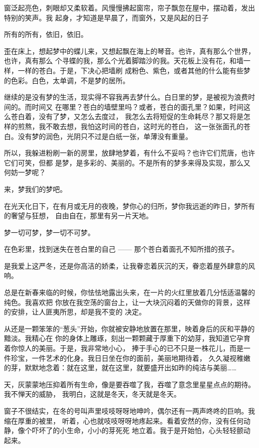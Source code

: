 		窗泛起亮色，刺眼却又柔软着。风慢慢拂起窗帘，帘子飘忽在屋中，摆动着，发出特别的笑声。我
	起身，才知道是早晨了，而窗外，又是风起的日子

		所有的所有，依旧，依旧。

		歪在床上，想起梦中的蝶儿来，又想起飘在海上的琴音。也许，真有那么个世界，也许，真有那么
	个寻蝶的我，那么个光着脚踏沙的我。天花板上没有花，和墙一样，一样的苍白。于是，下决心把墙刷
	成粉色、紫色，或者其他的什么能有些梦的色彩。白色，太单调，不是梦的居所。

		继续的是没有梦的生活，现实得不容我再去梦什么。白日里的梦，是被视为浪费时间的。而时间又
	在哪里？苍白的墙壁里吗？或者，苍白的面孔里？如果，时间这么苍白着，没有了梦，又怎么去度过，
	我怎么去将短促的生命耗尽？那又将是怎样的煎熬，我不敢去想，我怕这时间的苍白，这时光的苍白，
	这一张张面孔的苍白。没有梦的润色，光阴只不过是白纸一张，单薄没有重量。

		所以，我躲进粉刷一新的房里，放肆地梦着，有什么不妥吗？也许它们荒唐，也许它们可笑，但都
	是梦，是多彩的、美丽的。不是所有的梦多来得及实现，那么又何妨一梦呢？

		来，梦我们的梦吧。

		在光天化日下，在有月或无月的夜晚，梦你心的归所，梦你我远逝的昨日，梦所有的奢望与狂想，
	自由自在，那里有另一片天地。

		梦一切可梦，梦一切不可梦。

		在色彩里，找到迷失在苍白里的自己 —— 那个苍白着面孔不知所措的孩子。

	\endwriting



		是我爱上这严冬，还是你高洁的娇柔，让我眷恋着灰沉的天，眷恋着屋外肆意的风响。

		总是在新春来临的时候，你怯怯地露出头来，在一片的火红里放着几分恬适温馨的纯色。我喜欢把
	你放在我空荡的窗台上，让一大块沉闷着的天做你的背景，这样的安排，让人匪夷所思，却是我不变的
	决定。

		从还是一颗笨笨的“葱头”开始，你就被安静地放置在那里，映着身后的灰和平静的黯淡。我精心在
	你的身体上雕琢，刻出一颗颗藏于厚重下的幼芽，我知道它孕育着你惊人的美丽。于是，我非常地小心，
	捧于手心的已不只是一株花儿，而是一件珍宝，一件艺术的化身。我日日坐在你的面前，美丽地期待着，
	久久凝视稚嫩的芽，默默地念着：就在这里，就在这里，就要盛开出如昨的纯洁与美丽……

		天，灰蒙蒙地压抑着所有生命，像是要吞噬了我，吞噬了意念里星星点点的期待。我不惮天的威胁，
	我明白，这就是冬天，冬天就是冬天。

		窗子不很结实，在冬的号叫声里吱吱呀呀地呻吟，偶尔还有一两声咚咚的巨响。我缩在厚重的被里，
	听着，心也就吱吱呀呀地疼起来。看着安然的你，没有任何动静，像个吓坏了的小生命，小小的芽死死
	地立着。我于是开始怕，心头轻轻颤动起来。

